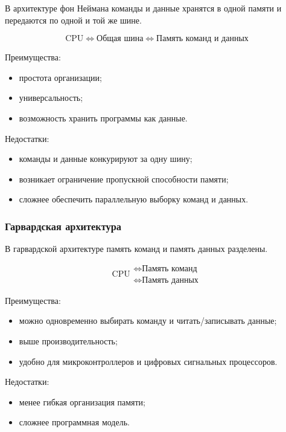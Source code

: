 \documentclass[12pt,a4paper]{article}
\theoremstyle{remark}
\begin{document}
В архитектуре фон Неймана команды и данные хранятся в одной памяти и передаются по одной и той же шине.

\[
\boxed{\text{CPU}}
\Longleftrightarrow
\boxed{\text{Общая шина}}
\Longleftrightarrow
\boxed{\text{Память команд и данных}}
\]

Преимущества:
\begin{itemize}
    \item простота организации;
    \item универсальность;
    \item возможность хранить программы как данные.
\end{itemize}

Недостатки:
\begin{itemize}
    \item команды и данные конкурируют за одну шину;
    \item возникает ограничение пропускной способности памяти;
    \item сложнее обеспечить параллельную выборку команд и данных.
\end{itemize}

\subsubsection{Гарвардская архитектура}

В гарвардской архитектуре память команд и память данных разделены.

\[
\boxed{\text{CPU}}
\begin{array}{c}
\Longleftrightarrow \boxed{\text{Память команд}} \\
\Longleftrightarrow \boxed{\text{Память данных}}
\end{array}
\]

Преимущества:
\begin{itemize}
    \item можно одновременно выбирать команду и читать/записывать данные;
    \item выше производительность;
    \item удобно для микроконтроллеров и цифровых сигнальных процессоров.
\end{itemize}

Недостатки:
\begin{itemize}
    \item менее гибкая организация памяти;
    \item сложнее программная модель.
\end{itemize}
\end{document}
